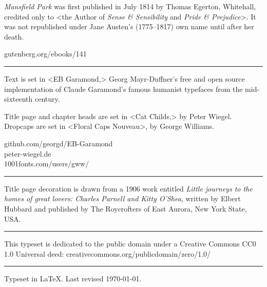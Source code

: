 \documentclass[
paper=5.5in:8.5in,
]{scrbook}
\begin{document}
\vfill
\begin{minipage}{\textwidth}
\textit{Mansfield Park} was first published in July 1814 by Thomas Egerton, Whitehall, credited only to <the Author of \textit{Sense \& Sensibility} and \textit{Pride \& Prejudice}>. It was not republished under Jane Austen's (1775--1817) own name until after her death.
\end{minipage}
\vfill
gutenberg.org/ebooks/141
\vfill
\rule{0.5\textwidth}{.4pt}
\vfill
\begin{minipage}{\textwidth}
Text is set in <EB Garamond,> Georg Mayr-Duffner's free and open source implementation of Claude Garamond’s famous humanist typefaces from the mid-sixteenth century. 

Title page and chapter heads are set in <Cat Childs,> by Peter Wiegel. Dropcaps are set in <Floral Caps Nouveau>, by George Williams. 
\end{minipage}
\vfill
github.com/georgd/EB-Garamond\\peter-wiegel.de\\1001fonts.com/users/gww/
\vfill
\rule{0.5\textwidth}{.4pt}
\vfill
\begin{minipage}{\textwidth}
Title page decoration is drawn from a 1906 work entitled \textit{Little journeys to the homes of great lovers: Charles Parnell and Kitty O'Shea}, written by Elbert Hubbard and published by The Roycrofters of East Aurora, New York State, USA.
\end{minipage}
\vfill
\rule{0.5\textwidth}{.4pt}
\vfill
\begin{minipage}{\textwidth}
This typeset is dedicated to the public domain under a Creative Commons CC0 1.0 Universal deed: creativecommons.org/publicdomain/zero/1.0/\\
\end{minipage}
\vfill
\rule{0.5\textwidth}{.4pt}
\vfill
Typeset in \LaTeX{}. Last revised \today.
\vfill
\thispagestyle{empty}
\end{document}
